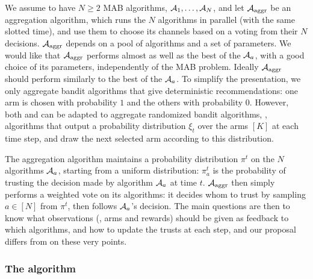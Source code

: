 We assume to have $N \geq 2$ MAB algorithms, $\mathcal{A}_1, \dots, \mathcal{A}_N$,
and let $\mathcal{A}_{\mathrm{aggr}}$ be an aggregation algorithm,
which runs the $N$ algorithms in parallel (with the same slotted time), and use them to choose its channels based on a voting from their $N$ decisions.
%
$\mathcal{A}_{\mathrm{aggr}}$ depends on a pool of algorithms and a set of parameters.
We would like that $\mathcal{A}_{\mathrm{aggr}}$
performs almost as well as the best of the $\mathcal{A}_a$, with a good choice of its parameters, independently of the MAB problem.
Ideally $\mathcal{A}_{\mathrm{aggr}}$ should perform similarly to the best of the $\mathcal{A}_a$.
%
To simplify the presentation, we only aggregate bandit algorithms that give deterministic recommendations:
one arm is chosen with probability $1$ and the others with probability $0$.
However, both \ExpQ{} and \Aggr{} can be adapted to aggregate randomized bandit algorithms, \ie, algorithms that output a probability distribution $\xi_t$ over the arms $[K]$ at each time step, and draw the next selected arm according to this distribution.

The aggregation algorithm maintains a probability distribution $\pi^{t}$ on the $N$ algorithms $\mathcal{A}_a$, starting from a uniform distribution:
$\pi^t_a$ is the probability of trusting the decision made by algorithm $\mathcal{A}_a$ at time $t$.
$\mathcal{A}_{\mathrm{aggr}}$ then simply performs a weighted vote on its algorithms: it decides whom to trust by sampling $a \in [N]$ from $\pi^t$, then follows $\mathcal{A}_a$'s decision.
The main questions are then to know what observations (\ie, arms and rewards) should be given as feedback to which algorithms,
and how to update the trusts at each step, and our proposal \Aggr{} differs from \ExpQ{} on these very points.


\subsubsection{The \Aggr{} algorithm}\label{sub:25:Aggr}

